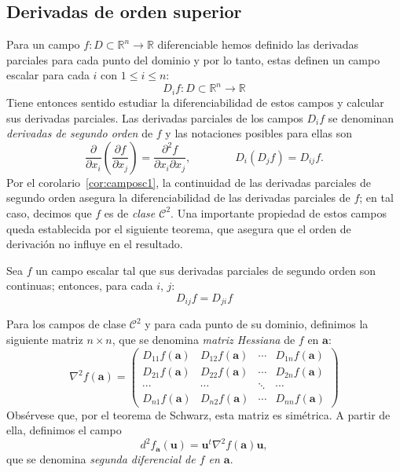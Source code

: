 \subsection{Derivadas de orden superior}

Para un campo $f\colon \mathit{D}\subset\mathbb{R}^n\to\mathbb{R}$ diferenciable hemos definido las derivadas parciales
para cada punto del dominio y por lo tanto, estas definen un campo escalar para cada $i$ con $1\leq i\leq n$:
\[
D_i f\colon \mathit{D}\subset\mathbb{R}^n\to \mathbb{R}
\]
Tiene entonces sentido estudiar la diferenciabilidad de estos campos y calcular sus derivadas parciales.
Las derivadas parciales de los campos $D_if$ se denominan \emph{derivadas de segundo orden} de $f$ y las notaciones posibles para ellas son
\[
\frac{\partial}{\partial x_i}\left(\frac{\partial f}{\partial x_j}\right)=
\dfrac{\partial^2 f}{\partial x_i\partial x_j},\qquad\qquad
D_i(D_jf)=D_{i j}f.
\]
Por el corolario~\ref{cor:camposc1}, la continuidad de las derivadas parciales de segundo orden asegura la diferenciabilidad de las derivadas parciales de $f$;
en tal caso, decimos que $f$ es de
\emph{clase $\mathcal C^2$}.
Una importante propiedad de estos campos queda establecida por el siguiente teorema, que asegura que el orden de derivación no influye en el resultado.
%
\begin{teorema}[de Schwarz]
Sea $f$ un campo escalar tal que sus derivadas parciales de segundo orden son continuas; entonces,
para cada $i$, $j$:
\[
D_{ij}f=D_{ji}f
\]
\end{teorema}
%
Para los campos de clase $\mathcal C^2$ y para cada punto de su dominio, definimos la siguiente matriz $n\times n$, que se denomina \emph{matriz Hessiana} de $f$ en $\boldsymbol a$:
\[
\nabla^2f(\boldsymbol{a}) =
\left(\begin{array}{cccc}
D_{11}f(\boldsymbol{a}) & D_{12}f(\boldsymbol{a}) & \cdots & D_{1n}f(\boldsymbol{a})\\
D_{21}f(\boldsymbol{a}) & D_{22}f(\boldsymbol{a}) & \cdots & D_{2n}f(\boldsymbol{a})\\
\cdots & \cdots & \ddots & \cdots\\
D_{n1}f(\boldsymbol{a}) & D_{n2}f(\boldsymbol{a}) & \cdots & D_{nn}f(\boldsymbol{a})
\end{array}\right)
\]
Obsérvese que, por el teorema de Schwarz, esta matriz es simétrica.
A partir de ella, definimos el campo
\[
d^2f_{\boldsymbol a}(\boldsymbol{u})=\boldsymbol{u}^t\nabla^2f(\boldsymbol{a})\boldsymbol{u},
\]
que se denomina \emph{segunda diferencial de $f$ en $\boldsymbol a$}.
